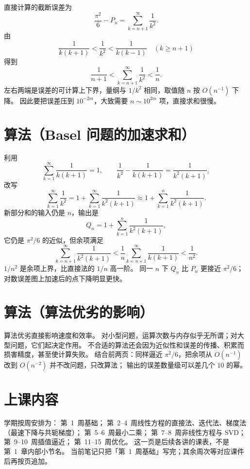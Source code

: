 直接计算的截断误差为
\[
\frac{\pi^2}{6}-P_n=\sum_{k=n+1}^{\infty}\frac{1}{k^2}.
\]
由
\[
\frac{1}{k(k+1)}<\frac{1}{k^2}<\frac{1}{k(k-1)}\quad(k\ge n+1)
\]
得到
\[
\frac{1}{n+1}<\sum_{k=n+1}^{\infty}\frac{1}{k^2}<\frac{1}{n}.
\]
左右两端是误差的可计算上下界，量纲与 $1/k^2$ 相同，取值随 $n$ 按 $O(n^{-1})$ 下降。
因此要把误差压到 $10^{-2m}$，大致需要 $n\sim 10^{2m}$ 项，直接求和很慢。


\section{算法（Basel 问题的加速求和）}

利用
\[
\sum_{k=1}^{\infty}\frac{1}{k(k+1)}=1,
\qquad
\frac{1}{k^2}-\frac{1}{k(k+1)}=\frac{1}{k^2(k+1)},
\]
改写
\[
\sum_{k=1}^{\infty}\frac{1}{k^2}
=1+\sum_{k=1}^{\infty}\frac{1}{k^2(k+1)}
\approx 1+\sum_{k=1}^{n}\frac{1}{k^2(k+1)}.
\]
新部分和的输入仍是 $n$，输出是
\[
Q_n=1+\sum_{k=1}^{n}\frac{1}{k^2(k+1)},
\]
它仍是 $\pi^2/6$ 的近似，但余项满足
\[
\sum_{k=n+1}^{\infty}\frac{1}{k^2(k+1)}
<\frac{1}{n}\sum_{k=n+1}^{\infty}\frac{1}{k(k+1)}
<\frac{1}{n^2}.
\]
$1/n^2$ 是余项上界，比直接法的 $1/n$ 高一阶。
同一 $n$ 下 $Q_n$ 比 $P_n$ 更接近 $\pi^2/6$；对数误差图上加速后的点下降明显更快。


\section{算法（算法优劣的影响）}

算法优劣直接影响速度和效率。
对小型问题，运算次数与内存似乎无所谓；对大型问题，它们起决定作用。
不合适的算法还会因为近似性和误差的传播、积累而损害精度，甚至使计算失败。
结合前两页：同样逼近 $\pi^2/6$，把余项从 $O(n^{-1})$ 改到 $O(n^{-2})$ 并不改问题，只改算法；
输出的误差数量级可以差几个 $10$ 的幂。

\section{上课内容}

学期按周安排为：
第~1~周基础；
第~2--4~周线性方程的直接法、迭代法、梯度法（最速下降与共轭梯度）；
第~5--6~周最小二乘；
第~7--8~周非线性方程与 SVD；
第~9--10~周插值逼近；
第~11--15~周优化。
这一页是后续各讲的课表，不是第~1~章内部小节名。
当前笔记只把「第~1~周基础」写完；其余周次等对应课件后再按页追加。
